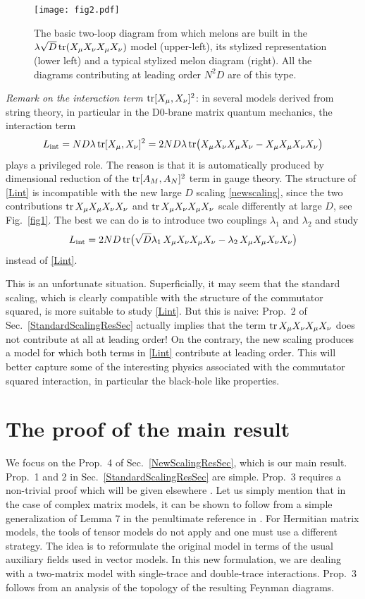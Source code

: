 \documentclass[12pt]{article}
\numberwithin{equation}{section}
\def\be{\begin{equation}}\def\ee{\end{equation}}
\def\la{\lambda}\def\La{\Lambda}\def\Seff{S_{\text{eff}}}
\begin{document}
%
\begin{figure}
\centerline{\texttt{[image: fig2.pdf]}}
\caption{The basic two-loop diagram from which melons are built in the $\lambda\sqrt{D}\mathop{\rm tr}\nolimits (X_{\mu}X_{\nu}X_{\mu}X_{\nu})$ model (upper-left), its stylized representation (lower left) and a typical stylized melon diagram (right). All the diagrams contributing at leading order $N^{2}D$ are of this type.\label{fig2}}
\end{figure}
%

\noindent\emph{Remark on the interaction term $\mathop{\rm tr}\nolimits [X_{\mu},X_{\nu}]^{2}$}: in several models derived from string theory, in particular in the D0-brane matrix quantum mechanics, the interaction term 
%
\be\label{Lint} L_{\text{int}} = N D \la \tr [X_{\mu},X_{\nu}]^{2} = 2 ND \la\tr \bigl(X_{\mu}X_{\nu}X_{\mu}X_{\nu} - X_{\mu}X_{\mu}X_{\nu}X_{\nu}\bigr)\ee
%
plays a privileged role. The reason is that it is automatically produced by dimensional reduction of the $\mathop{\rm tr}\nolimits [A_{M},A_{N}]^{2}$ term in gauge theory. The structure of \eqref{Lint} is incompatible with the new large $D$ scaling \eqref{newscaling}, since the two contributions $\mathop{\rm tr}\nolimits X_{\mu}X_{\mu}X_{\nu}X_{\nu}$ and $\mathop{\rm tr}\nolimits X_{\mu}X_{\nu}X_{\mu}X_{\nu}$ scale differently at large $D$, see Fig.\ \ref{fig1}. The best we can do is to introduce two couplings $\la_{1}$ and $\la_{2}$ and study
%
\be\label{Lint2} L_{\text{int}}= 2 ND \tr \bigl(\sqrt{D}\la_{1}\, X_{\mu}X_{\nu}X_{\mu}X_{\nu} - \la_{2}\, X_{\mu}X_{\mu}X_{\nu}X_{\nu}\bigr)\ee
%
instead of \eqref{Lint}.

This is an unfortunate situation. Superficially, it may seem that the standard scaling, which is clearly compatible with the structure of the commutator squared, is more suitable to study \eqref{Lint}. But this is naive: Prop.\ 2 of Sec.\ \ref{StandardScalingResSec} actually implies that the term $\mathop{\rm tr}\nolimits X_{\mu}X_{\nu}X_{\mu}X_{\nu}$ does not contribute at all at leading order! On the contrary, the new scaling produces a model for which both terms in \eqref{Lint} contribute at leading order. This will better capture some of the interesting physics associated with the commutator squared interaction, in particular the black-hole like properties.

%
\section{\label{s3Sec} The proof of the main result}
%

We focus on the Prop.\ 4 of Sec.\ \ref{NewScalingResSec}, which is our main result. Prop.\ 1 and 2 in Sec.\ \ref{StandardScalingResSec} are simple. Prop.\ 3 requires a non-trivial proof which will be given elsewhere \cite{Fernew}. Let us simply mention that in the case of complex matrix models, it can be shown to follow from a simple generalization of Lemma 7 in the penultimate reference in \cite{Gurau1}. For Hermitian matrix models, the tools of tensor models do not apply and one must use a different strategy. The idea is to reformulate the original model in terms of the usual auxiliary fields used in vector models. In this new formulation, we are dealing with a two-matrix model with single-trace and double-trace interactions. Prop.\ 3 follows from an analysis of the topology of the resulting Feynman diagrams.
\end{document}
